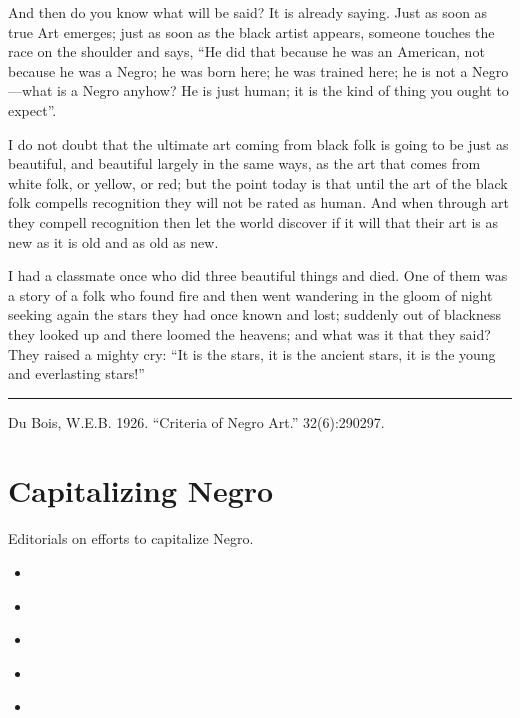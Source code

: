 \documentclass[letterpaper,10pt,english]{jupyterBook}
\begin{document}
\sphinxAtStartPar
And then do you know what will be said? It is already saying. Just as soon as true Art emerges; just as soon as the black artist appears, someone touches the race on the shoulder and says, “He did that because he was an American, not because he was a Negro; he was born here; he was trained here; he is not a Negro—what is a Negro anyhow? He is just human; it is the kind of thing you ought to expect”.

\sphinxAtStartPar
I do not doubt that the ultimate art coming from black folk is going to be just as beautiful, and beautiful largely in the same ways, as the art that comes from white folk, or yellow, or red; but the point today is that until the art of the black folk compells recognition they will not be rated as human. And when through art they compell recognition then let the world discover if it will that their art is as new as it is old and as old as new.

\sphinxAtStartPar
I had a classmate once who did three beautiful things and died. One of them was a story of a folk who found fire and then went wandering in the gloom of night seeking again the stars they had once known and lost; suddenly out of blackness they looked up and there loomed the heavens; and what was it that they said? They raised a mighty cry: “It is the stars, it is the ancient stars, it is the young and everlasting stars!”


\bigskip\hrule\bigskip


\sphinxAtStartPar
{} Du Bois, W.E.B. 1926. “Criteria of Negro Art.”  32(6):290\sphinxhyphen{}297.


\section{Capitalizing Negro}
\label{\detokenize{Sections/capital_n:capitalizing-negro}}\label{\detokenize{Sections/capital_n::doc}}
\sphinxAtStartPar
Editorials on efforts to capitalize Negro.
\begin{itemize}
\item {} 
\sphinxAtStartPar
{\hyperref[\detokenize{Volumes/09/02/negro::doc}]{}}

\item {} 
\sphinxAtStartPar
{\hyperref[\detokenize{Volumes/11/04/that_capital_n::doc}]{}}

\item {} 
\sphinxAtStartPar
{\hyperref[\detokenize{Volumes/35/03/name_negro::doc}]{}}

\item {} 
\sphinxAtStartPar
{\hyperref[\detokenize{Volumes/37/02/that_capital_n::doc}]{}}

\item {} 
\sphinxAtStartPar
{\hyperref[\detokenize{Volumes/37/05/capital_n::doc}]{}}

\end{itemize}
\end{document}
